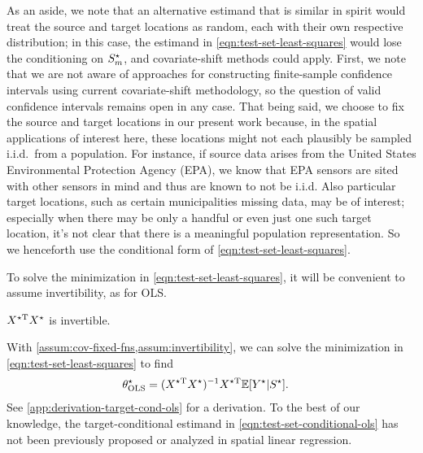 As an aside, we note that an alternative estimand that is similar in spirit would treat the source and target locations as random, each with their own respective distribution; in this case, the estimand in \cref{eqn:test-set-least-squares} would lose the conditioning on $S^{\star}_m$, and covariate-shift methods could apply. First, we note that we are not aware of approaches for constructing finite-sample confidence intervals using current covariate-shift methodology, so the question of valid confidence intervals remains open in any case. That being said, we choose to fix the source and target locations in our present work because, in the spatial applications of interest here, these locations might not each plausibly be sampled i.i.d.\ from a population. For instance, if source data arises from the United States Environmental Protection Agency (EPA), we know that EPA sensors are sited with other sensors in mind and thus are known to not be i.i.d. Also particular target locations, such as certain municipalities missing data, may be of interest; especially when there may be only a handful or even just one such target location, it's not clear that there is a meaningful population representation. So we henceforth use the conditional form of \cref{eqn:test-set-least-squares}.

To solve the minimization in \cref{eqn:test-set-least-squares}, it will be convenient to assume invertibility, as for OLS.
\begin{assumption}\label{assum:invertibility}
$X^{\star\mathrm{T}}X^{\star}$ is invertible.
\end{assumption}
With \cref{assum:cov-fixed-fns,assum:invertibility}, we can solve the minimization in \cref{eqn:test-set-least-squares} to find
\begin{align}
    \theta^{\star}_{\text{OLS}} &= (X^{\star\mathrm{T}}X^{\star})^{-1}X^{\star\mathrm{T}}\mathbb{E}[Y^{\star}|S^{\star}]. \label{eqn:test-set-conditional-ols}
\end{align}
See \cref{app:derivation-target-cond-ols} for a  derivation. To the best of our knowledge, the target-conditional estimand in \cref{eqn:test-set-conditional-ols} has not been previously proposed or analyzed in spatial linear regression.

